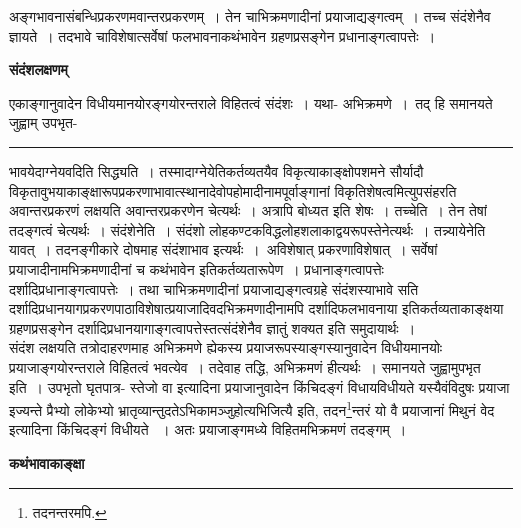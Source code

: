 \documentclass[11pt, openany]{book}
\makeatletter
\def\blfootnote{\gdef\@thefnmark{}\@footnotetext}
\makeatother
\begin{document}
{\bl अङ्गभावनासंबन्धिप्रकरणमवान्तरप्रकरणम्~। तेन चाभिक्रमणादीनां प्रयाजाद्यङ्गत्वम्~। तच्च संदंशेनैव ज्ञायते~। तदभावे चाविशेषात्सर्वेषां फलभावनाकथंभावेन ग्रहणप्रसङ्गेन प्रधानाङ्गत्वापत्तेः~।}
\begin{center}
 \textbf{संदंशलक्षणम्}   
\end{center}
 
{\bl एकाङ्गानुवादेन विधीयमानयोरङ्गयोरन्तराले विहितत्वं संदंशः~। यथा- अभिक्रमणे~।~तद् हि {\qtl समानयते जुह्वाम् उपभृत-\\ }}
\hrule
\vspace{3mm}
\noindent
भावयेदाग्नेयवदिति सिद्ध्यति~। तस्मादाग्नेयेतिकर्तव्यतयैव विकृत्याकाङ्क्षोपशमने सौर्यादौ विकृतावुभयाकाङ्क्षारूपप्रकरणाभावात्स्थानादेवोपहोमादीनामपूर्वाङ्गानां
विकृतिशेषत्वमित्युपसंहरति \\

 अवान्तरप्रकरणं लक्षयति अवान्तरप्रकरणेन चेत्यर्थः~। अत्रापि बोध्यत इति शेषः~। {\br तच्चेति~।}  तेन तेषां तदङ्गत्वं
चेत्यर्थः~। {\br संदंशेनेति~।} संदंशो लोहकण्टकविद्धलोहशलाकाद्वयरूपस्तेनेत्यर्थः~। तन्न्यायेनेति यावत्~। तदनङ्गीकारे दोषमाह संदंशाभाव इत्यर्थः~।~{\br अविशेषात्} प्रकरणाविशेषात्~। {\br सर्वेषां} प्रयाजादीनामभिक्रमणादीनां च {\br कथंभावेन} इतिकर्तव्यतारूपेण~। {\br प्रधानाङ्गत्वापत्तेः}
दर्शादिप्रधानाङ्गत्वापत्तेः~। तथा चाभिक्रमणादीनां प्रयाजाद्यङ्गत्वग्रहे संदंशस्याभावे सति दर्शादिप्रधानयागप्रकरणपाठाविशेषात्प्रयाजादिवदभिक्रमणादीनामपि दर्शादिफलभावनाया इतिकर्तव्यताकाङ्क्षया ग्रहणप्रसङ्गेन दर्शादिप्रधानयागाङ्गत्वापत्तेस्तत्संदंशेनैव ज्ञातुं शक्यत इति समुदायार्थः~। \\


 संदंश लक्षयति तत्रोदाहरणमाह अभिक्रमणे ह्येकस्य प्रयाजरूपस्याङ्गस्यानुवादेन विधीयमानयोः प्रयाजाङ्गयोरन्तराले विहितत्वं भवत्येव~। तदेवाह तद्धि, अभिक्रमणं हीत्यर्थः~। {\br समानयते जुह्वामुपभृत इति~।} उपभृतो घृतपात्र-
\newpage
\fancyhead[RE]{[कथंभावाकाङ्क्षा]}
{\bl \noindent  स्तेजो वा इत्यादिना
प्रयाजानुवादेन किंचिदङ्गं विधाय\blfootnote{पाठा०\textemdash\ $^{१}$विधाय तदनन्तरमपि.}\footnotemark विधीयते {\qtl यस्यैवंविदुषः प्रयाजा
इज्यन्ते प्रैभ्यो लोकेभ्यो भ्रातृव्यान्तुदतेऽभिकामञ्जुहोत्यभिजित्यै}
इति, तदन\footnote{तदनन्तरमपि.}न्तरं {\qtl यो वै प्रयाजानां मिथुनं वेद} इत्यादिना किंचिदङ्गं विधीयते
~। अतः प्रयाजाङ्गमध्ये विहितमभिक्रमणं तदङ्गम्~।}
\begin{center}
 \textbf{कथंभावाकाङ्क्षा}   
\end{center}
 
\end{document}
